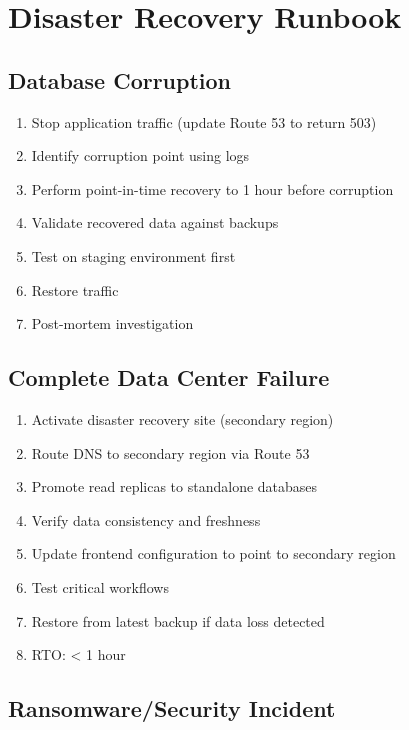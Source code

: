 \documentclass{report}
\begin{document}
\section{Disaster Recovery Runbook}

\subsection{Database Corruption}

\begin{enumerate}
  \item Stop application traffic (update Route 53 to return 503)
  \item Identify corruption point using logs
  \item Perform point-in-time recovery to 1 hour before corruption
  \item Validate recovered data against backups
  \item Test on staging environment first
  \item Restore traffic
  \item Post-mortem investigation
\end{enumerate}

\subsection{Complete Data Center Failure}

\begin{enumerate}
  \item Activate disaster recovery site (secondary region)
  \item Route DNS to secondary region via Route 53
  \item Promote read replicas to standalone databases
  \item Verify data consistency and freshness
  \item Update frontend configuration to point to secondary region
  \item Test critical workflows
  \item Restore from latest backup if data loss detected
  \item RTO: < 1 hour
\end{enumerate}

\subsection{Ransomware/Security Incident}
\end{document}
